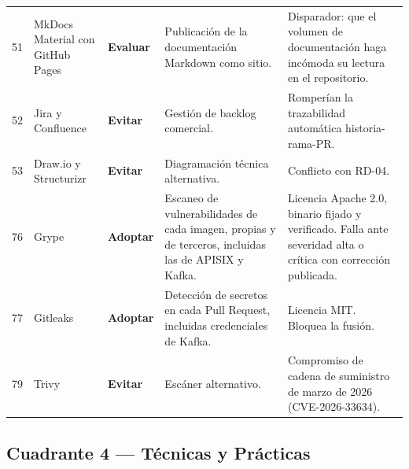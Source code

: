 \documentclass[11pt,a4paper]{article}
\newcommand{\adoptar}{\textcolor{ringAdoptar}{\textbf{Adoptar}}}
\newcommand{\evaluar}{\textcolor{ringEvaluar}{\textbf{Evaluar}}}
\newcommand{\evitar}{\textcolor{ringEvitar}{\textbf{Evitar}}}
\begin{document}
\begin{longtable}{L{0.8cm} L{2.6cm} L{1.6cm} L{4.1cm} L{4.5cm}}
51 & MkDocs Material con GitHub Pages & \evaluar{} & Publicación de la documentación Markdown como sitio. & Disparador: que el volumen de documentación haga incómoda su lectura en el repositorio. \\

52 & Jira y Confluence & \evitar{} & Gestión de backlog comercial. & Romperían la trazabilidad automática historia-rama-PR. \\

53 & Draw.io y Structurizr & \evitar{} & Diagramación técnica alternativa. & Conflicto con RD-04. \\

76 & Grype & \adoptar{} & Escaneo de vulnerabilidades de cada imagen, propias y de terceros, incluidas las de APISIX y Kafka. & Licencia Apache 2.0, binario fijado y verificado. Falla ante severidad alta o crítica con corrección publicada. \\

77 & Gitleaks & \adoptar{} & Detección de secretos en cada Pull Request, incluidas credenciales de Kafka. & Licencia MIT. Bloquea la fusión. \\

79 & Trivy & \evitar{} & Escáner alternativo. & Compromiso de cadena de suministro de marzo de 2026 (CVE-2026-33634). \\

\end{longtable}

\subsection{Cuadrante 4 — Técnicas y Prácticas}
\label{sec:q4}
\end{document}
